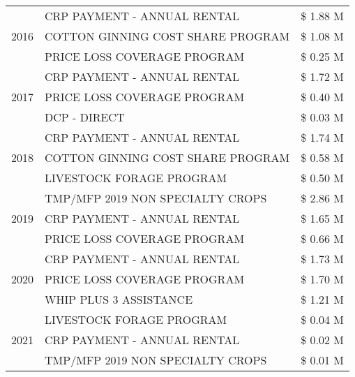 \begin{tabular}{llr}
\cline{1-3}
\multirow[t]{3}{*}{2016} & CRP PAYMENT - ANNUAL RENTAL & \$ 1.88 M \\
 & COTTON GINNING COST SHARE PROGRAM & \$ 1.08 M \\
 & PRICE LOSS COVERAGE PROGRAM & \$ 0.25 M \\
\cline{1-3}
\multirow[t]{3}{*}{2017} & CRP PAYMENT - ANNUAL RENTAL & \$ 1.72 M \\
 & PRICE LOSS COVERAGE PROGRAM & \$ 0.40 M \\
 & DCP - DIRECT & \$ 0.03 M \\
\cline{1-3}
\multirow[t]{3}{*}{2018} & CRP PAYMENT - ANNUAL RENTAL & \$ 1.74 M \\
 & COTTON GINNING COST SHARE PROGRAM & \$ 0.58 M \\
 & LIVESTOCK FORAGE PROGRAM & \$ 0.50 M \\
\cline{1-3}
\multirow[t]{3}{*}{2019} & TMP/MFP 2019 NON SPECIALTY CROPS & \$ 2.86 M \\
 & CRP PAYMENT - ANNUAL RENTAL & \$ 1.65 M \\
 & PRICE LOSS COVERAGE PROGRAM & \$ 0.66 M \\
\cline{1-3}
\multirow[t]{3}{*}{2020} & CRP PAYMENT - ANNUAL RENTAL & \$ 1.73 M \\
 & PRICE LOSS COVERAGE PROGRAM & \$ 1.70 M \\
 & WHIP PLUS 3 ASSISTANCE & \$ 1.21 M \\
\cline{1-3}
\multirow[t]{3}{*}{2021} & LIVESTOCK FORAGE PROGRAM & \$ 0.04 M \\
 & CRP PAYMENT - ANNUAL RENTAL & \$ 0.02 M \\
 & TMP/MFP 2019 NON SPECIALTY CROPS & \$ 0.01 M \\
\cline{1-3}
\bottomrule
\end{tabular}
